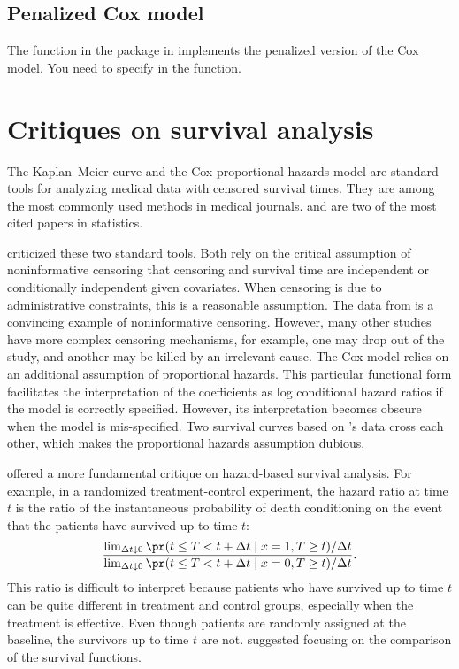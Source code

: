  
 
 
 

\subsection{Penalized Cox model}


The  function in the  package in  implements the penalized version of the Cox model. You need to specify   in the function. 
 


\section{Critiques on survival analysis}


The Kaplan--Meier curve and the Cox proportional hazards model are standard tools for analyzing medical data with censored survival times. They are among the most commonly used methods in medical journals. \citet{kaplan1958nonparametric} and \citet{cox1972regression} are two of the most cited papers in statistics. 

\citet{freedman2008survival} criticized these two standard tools. Both rely on the critical assumption of noninformative censoring that censoring and survival time are independent or conditionally independent given covariates. When censoring is due to administrative constraints, this is a reasonable assumption. The data from \citet{lin2016simultaneous} is a convincing example of noninformative censoring.  However, many other studies have more complex censoring mechanisms, for example, one may drop out of the study, and another may be killed by an irrelevant cause. The Cox model relies on an additional assumption of proportional hazards. This particular functional form facilitates the interpretation of the coefficients as log conditional hazard ratios if the model is correctly specified. However, its interpretation becomes obscure when the model is mis-specified.  Two survival curves based on \citet{lin2016simultaneous}'s data cross each other, which makes the proportional hazards assumption dubious. 


\citet{hernan2010hazards} offered a more fundamental critique on hazard-based survival analysis. For example, in a randomized treatment-control experiment, the hazard ratio at time $t$ is the ratio of the instantaneous probability of death conditioning on the event that the patients have survived up to time $t$:
$$
\frac{   \lim_{\Delta t\downarrow0}\pr(t\leq T<t+\Delta t\mid x=1, T\geq t)/\Delta t  }
{  \lim_{\Delta t\downarrow0}\pr(t\leq T<t+\Delta t\mid x=0, T\geq t)/\Delta t  } . 
$$
This ratio is difficult to interpret because patients who have survived up to time $t$ can be quite different in treatment and control groups, especially when the treatment is effective. Even though patients are randomly assigned at the baseline, the survivors up to time $t$ are not. \citet{hernan2010hazards} suggested focusing on the comparison of the survival functions. 




